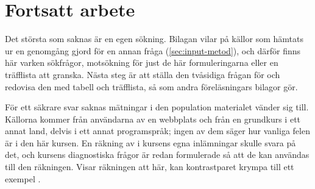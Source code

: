 \section{Fortsatt arbete}
\label{sec:input-fortsatt}

Det största som saknas är en egen sökning.  Bilagan vilar på källor
som hämtats ur en genomgång gjord för en annan fråga
(\cref{sec:input-metod}), och därför finns här varken sökfrågor,
motsökning för just de här formuleringarna eller en träfflista att
granska.  Nästa steg är att ställa den tvåsidiga frågan för
 och redovisa den med tabell och träfflista, så som andra
föreläsningars bilagor gör.%

För ett säkrare svar saknas mätningar i den population materialet
vänder sig till.  Källorna kommer från användarna av en webbplats och
från en grundkurs i ett annat land, delvis i ett annat programspråk;
ingen av dem säger hur vanliga felen är i den här kursen.  En räkning
av  i kursens egna inlämningar
skulle svara på det, och kursens diagnostiska frågor är redan
formulerade så att de kan användas till den räkningen.%
  Visar räkningen att  här, kan kontrastparet krympa till ett exempel%
.

